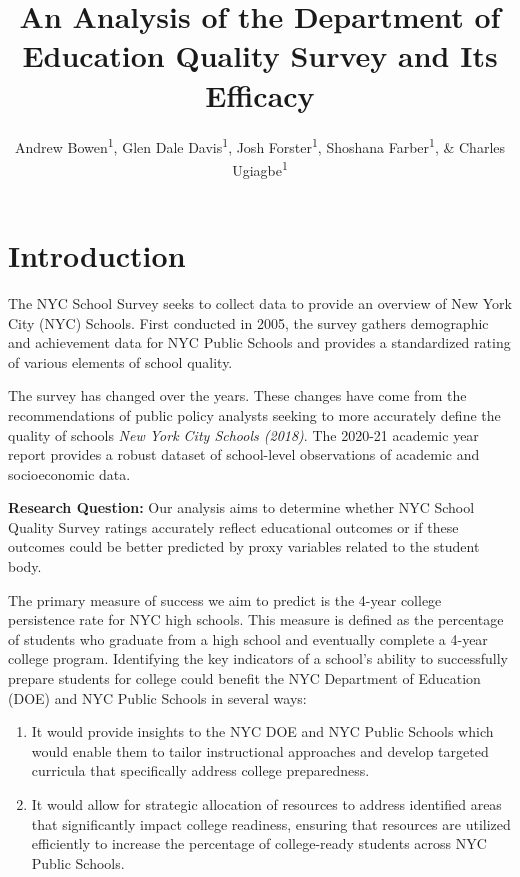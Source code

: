 \documentclass[
  man,floatsintext]{apa6}
\title{An Analysis of the Department of Education Quality Survey and Its Efficacy}
\author{Andrew Bowen\textsuperscript{1}, Glen Dale Davis\textsuperscript{1}, Josh Forster\textsuperscript{1}, Shoshana Farber\textsuperscript{1}, \& Charles Ugiagbe\textsuperscript{1}}
\date{}
\affiliation{\vspace{0.5cm}\textsuperscript{1} City University of New York}
\providecommand{\tightlist}{%
  \setlength{\itemsep}{0pt}\setlength{\parskip}{0pt}}
\begin{document}
\maketitle

\hypertarget{introduction}{%
\section{Introduction}\label{introduction}}

The NYC School Survey seeks to collect data to provide an overview of New York City (NYC) Schools. First conducted in 2005, the survey gathers demographic and achievement data for NYC Public Schools and provides a standardized rating of various elements of school quality.

The survey has changed over the years. These changes have come from the recommendations of public policy analysts seeking to more accurately define the quality of schools \emph{New York City Schools (2018)}. The 2020-21 academic year report provides a robust dataset of school-level observations of academic and socioeconomic data.

\textbf{Research Question:} Our analysis aims to determine whether NYC School Quality Survey ratings accurately reflect educational outcomes or if these outcomes could be better predicted by proxy variables related to the student body.

The primary measure of success we aim to predict is the 4-year college persistence rate for NYC high schools. This measure is defined as the percentage of students who graduate from a high school and eventually complete a 4-year college program. Identifying the key indicators of a school's ability to successfully prepare students for college could benefit the NYC Department of Education (DOE) and NYC Public Schools in several ways:

\begin{enumerate}
\def\labelenumi{\arabic{enumi}.}
\tightlist
\item
  It would provide insights to the NYC DOE and NYC Public Schools which would enable them to tailor instructional approaches and develop targeted curricula that specifically address college preparedness.
\item
  It would allow for strategic allocation of resources to address identified areas that significantly impact college readiness, ensuring that resources are utilized efficiently to increase the percentage of college-ready students across NYC Public Schools.
\end{enumerate}
\end{document}
